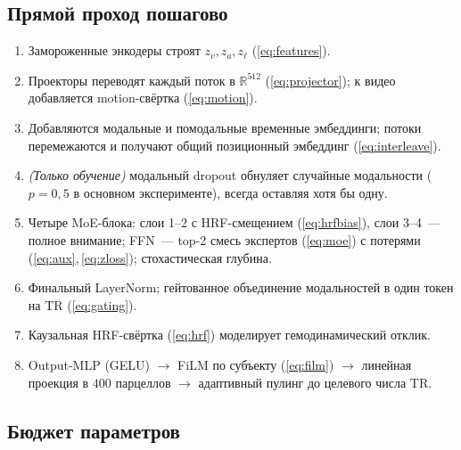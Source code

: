 \documentclass[11pt,a4paper]{article}
\begin{document}
\subsection{Прямой проход пошагово}
\label{sec:forward}

\begin{enumerate}[label=\textbf{\arabic*.}, leftmargin=*, itemsep=1pt]
    \item Замороженные энкодеры строят $z_v, z_a, z_\ell$
          (\cref{eq:features}).
    \item Проекторы переводят каждый поток в $\mathbb{R}^{512}$
          (\cref{eq:projector}); к видео добавляется motion-свёртка
          (\cref{eq:motion}).
    \item Добавляются модальные и помодальные временные эмбеддинги;
          потоки перемежаются и получают общий позиционный
          эмбеддинг (\cref{eq:interleave}).
    \item \emph{(Только обучение)} модальный dropout обнуляет
          случайные модальности ($p = 0{,}5$ в основном эксперименте),
          всегда оставляя хотя бы одну.
    \item Четыре MoE-блока: слои 1--2 с HRF-смещением
          (\cref{eq:hrfbias}), слои 3--4~--- полное внимание; FFN~---
          top-2 смесь экспертов (\cref{eq:moe}) с потерями
          (\cref{eq:aux},\,\cref{eq:zloss}); стохастическая глубина.
    \item Финальный LayerNorm; гейтованное объединение модальностей
          в один токен на TR (\cref{eq:gating}).
    \item Каузальная HRF-свёртка (\cref{eq:hrf}) моделирует
          гемодинамический отклик.
    \item Output-MLP (GELU) $\rightarrow$ FiLM по субъекту
          (\cref{eq:film}) $\rightarrow$ линейная проекция в $400$
          парцеллов $\rightarrow$ адаптивный пулинг до целевого
          числа TR.
\end{enumerate}

\subsection{Бюджет параметров}
\label{sec:params}
\end{document}
